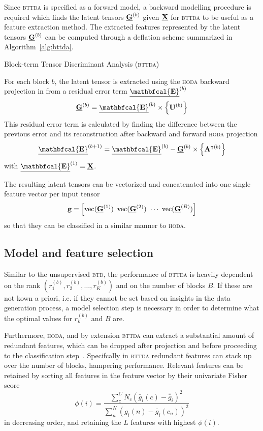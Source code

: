 \documentclass[twocolumn]{article}
\begin{document}
Since \textsc{bttda} is specified as a forward model, a backward modelling
procedure is required which finds the latent tensors $\underline{\mathbf{G}}^{(b)}$ given $\underline{\mathbf{X}}$ for
\textsc{bttda} to be useful as a feature extraction method.
The extracted features represented by the latent tensors $\underline{\mathbf{G}}^{(b)}$ can be
computed through a deflation scheme summarized in Algorithm~\ref{alg:bttda}.
\begin{algorithm}
  \caption{Block-term Tensor Discriminant Analysis (\textsc{bttda})}
  \label{alg:bttda}
  
\end{algorithm}
For each block $b$, the latent tensor is extracted using the \textsc{hoda} backward
projection in from a residual error term
$\ten{\mathbfcal{E}}^{(b)}$
\begin{equation}
  \ten{G}^{(b)} = \ten{\mathbfcal{E}}^{(b)}\mmpr{\mat{U}^{(b)}}
\end{equation}
This residual error term is calculated by finding the difference between the
previous error and its reconstruction after backward and forward \textsc{hoda}
projection
\begin{equation}
  \ten{\mathbfcal{E}}^{(b+1)} = \ten{\mathbfcal{E}}^{(b)} - \ten{G}^{(b)}
  \mmpr{\mat{A}^{\intercal(b)}}
\end{equation}
with $\ten{\mathbfcal{E}}^{(1)}=\ten{X}$.

The resulting latent tensors can be vectorized and concatenated into
one single feature vector per input tensor
\begin{equation}
\mathbf{g}
  =\left[\operatorname{vec}(\underline{\mathbf{G}}^{(1)})\
  \operatorname{vec}(\underline{\mathbf{G}}^{(2)})\
  \cdots\
  \operatorname{vec}(\underline{\mathbf{G}}^{(B)})\right]
\end{equation}
so that they can be classified in a similar manner to \textsc{hoda}.


\subsection{Model and feature selection}
Similar to the unsupervised \textsc{btd}, the performance of \textsc{bttda} is
heavily dependent on the rank $(r_1^{(b)}, r_2^{(b)}, \ldots,
r_K^{(b)})$ and on the number of blocks $B$.
If these are not kown a priori, i.e. if they cannot be set based on insights in the
data generation process, a model selection step is necessary in order to
determine what the optimal values for $r_k^{(b)}$ and $B$ are.

Furthermore, \textsc{hoda}, and by extension \textsc{bttda} can extract a substantial amount
of redundant features, which can be dropped after projection and before proceeding to the classification
step~\cite{Phan2010}.
Specifcally in \textsc{bttda} redundant features can stack up over the number of
blocks, hampering performance.
Relevant features can be retained by sorting all features in the feature vector
by their univariate Fisher score
\begin{equation}
  \phi(i) = \frac
  {\sum_c^C N_c \left(\bar{g}_i(c)-\bar{\bar{g}}_i\right)^2}
  {\sum_n^N \left(g_i(n)-\bar{g}_i(c_n)\right)^2}
\end{equation}
in decreasing order, and retaining the $L$ features with highest $\phi(i)$.
\end{document}
